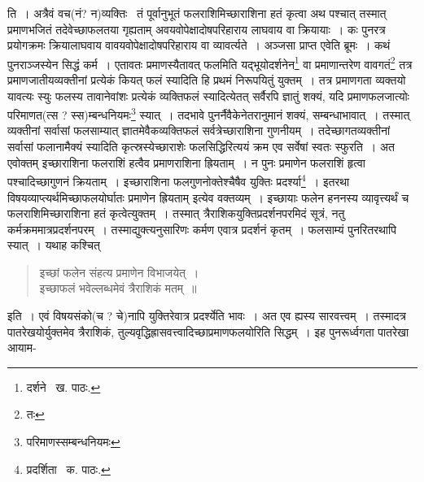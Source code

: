 \documentclass[11pt, openany]{book}
\begin{document}
ति~। अत्रैवं वच(नं? न)व्यक्तिः \textendash\ तं पूर्वानुभूतं फलराशिमिच्छाराशिना हतं कृत्वा अथ पश्चात् तस्मात् प्रमाणभजितं तदेवेच्छाफलतया गृह्यताम् अवयवोपेक्षादोषपरिहाराय लाघवाय वा क्रियायाः~। कः पुनरत्र प्रयोगक्रमः क्रियालाघवाय वावयवोपेक्षादोषपरिहाराय वा व्यावर्त्यते~। अञ्जसा प्राप्त एवेति ब्रूमः~। कथं पुनराञ्जस्येन सिद्धं कर्म~। एतावतः प्रमाणस्यैतावत् फलमिति यद्भूयोदर्शनेन\renewcommand{\thefootnote}{१}\footnote{दर्शने \textendash\ ख. पाठः.} वा प्रमाणान्तरेण वावगतं\renewcommand{\thefootnote}{२}\footnote{तः} तत्र प्रमाणजातीयव्यक्तीनां प्रत्येकं कियत् फलं स्यादिति हि प्रथमं निरूपयितुं युक्तम्~। तत्र प्रमाणगता व्यक्तयो यावत्यः स्युः फलस्य तावानेवांशः प्रत्येकं व्यक्तिफलं स्यादित्येतत् सर्वैरपि ज्ञातुं शक्यं, यदि प्रमाणफलजात्योः परिमाणत(त्स ? स्स)म्बन्धनियमः\renewcommand{\thefootnote}{३}\footnote{परिमाणस्सम्बन्धनियमः} स्यात्~। तदभावे पुनर्नैवैकेनेतरानुमानं शक्यं, सम्बन्धाभावात्~। तस्मात् व्यक्तीनां सर्वासां फलसाम्यात् ज्ञातमेवैकव्यक्तिफलं सर्वत्रेच्छाराशिना गुणनीयम्~। तदेच्छागतव्यक्तीनां सर्वासां फलानामैक्यं स्यादिति कृत्स्रस्येच्छाराशेः फलसिद्धिरित्ययं क्रम एव सर्वेषां स्वतः स्फुरति~। अत एवोक्तम् इच्छाराशिना फलराशिं हत्वैव प्रमाणराशिना ह्रियताम्~। न पुनः प्रमाणेन फलराशिं हृत्वा पश्चादिच्छागुणनं क्रियताम्~। इच्छाराशिना फलगुणनोक्तेश्चैषैव युक्तिः प्रदर्श्या\renewcommand{\thefootnote}{४}\footnote{प्रदर्शिता \textendash\ क. पाठः.}~। इतरथा
विषयव्याप्त्यर्थमिच्छाफलयोर्घातः प्रमाणेन ह्रियताम् इत्येव वक्तव्यम्~। इच्छायाः फलेन हननस्य व्यावृत्त्यर्थं च फलराशिमिच्छाराशिना हतं कृत्वेत्युक्तम्~। तस्मात् त्रैराशिकयुक्तिप्रदर्शनपरमिदं सूत्रं, नतु कर्मक्रममात्रप्रदर्शनपरम्~। तस्माद्युक्त्यनुसारिणः कर्मण एवात्र प्रदर्शनं कृतम्~। फलसाम्यं पुनरितरथापि स्यात्~। यथाह कश्चित्\textendash 

\begin{quote}
{\qt इच्छां फलेन संहत्य प्रमाणेन विभाजयेत्~।\\
इच्छाफलं भवेल्लब्धमेवं त्रैराशिकं मतम्~॥}
\end{quote}

\noindent इति~। एवं विषयसंको(च ? चे)नापि युक्तिरेवात्र प्रदर्श्येति भावः~। अत एव ह्यस्य सारवत्त्वम्~। तस्मादत्र पातरेखयोर्युक्तमेव त्रैराशिकं, तुल्यवृद्धिह्रासवत्त्वादिच्छाप्रमाणफलयोरिति सिद्धम्~। इह पुनरूर्ध्वगता पातरेखा आयाम-

\newpage
\end{document}
